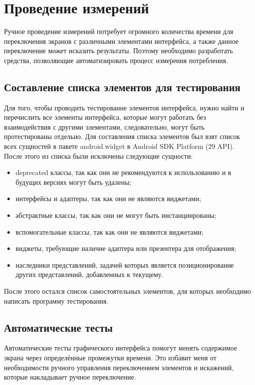 \documentclass[a4paper,14pt]{extarticle} %
\begin{document}
	\newpage
	\section{Проведение измерений}
	
	Ручное проведение измерений потребует огромного количества времени для переключения экранов с различными элементами интерфейса, а также данное переключение может исказить результаты. Поэтому необходимо разработать средства, позволяющие автоматизировать процесс измерения потребления.
	
	\subsection{Составление списка элементов для тестирования}
	
	Для того, чтобы проводить тестирование элементов интерфейса, нужно найти и перечислить все элементы интерфейса, которые могут работать без взаимодействия с другими элементами, следовательно, могут быть протестированы отдельно. Для составления списка элементов был взят список всех сущностей в пакете android.widget в Android SDK Platform (29 API). После этого из списка были исключены следующие сущности:
	\begin{itemize}
		\item deprecated классы, так как они не рекомендуются к использованию и в будущих версиях могут быть удалены;
		\item интерфейсы и адаптеры, так как они не являются виджетами;
		\item абстрактные классы, так как они не могут быть инстанциированы;
		\item вспомогательные классы, так как они не являются виджетами;
		\item виджеты, требующие наличие адаптера или презентера для отображения;
		\item наследники представлений, задачей которых является позиционирование других представлений, добавленных к текущему.
	\end{itemize}
	
	После этого остался список самостоятельных элементов, для которых необходимо написать программу тестирования.
	
	\subsection{Автоматические тесты}
	
	Автоматические тесты графического интерфейса помогут менять содержимое экрана через определённые промежутки времени. Это избавит меня от необходимости ручного управления переключением элементов и искажений, которые накладывает ручное переключение.
	
\end{document}
